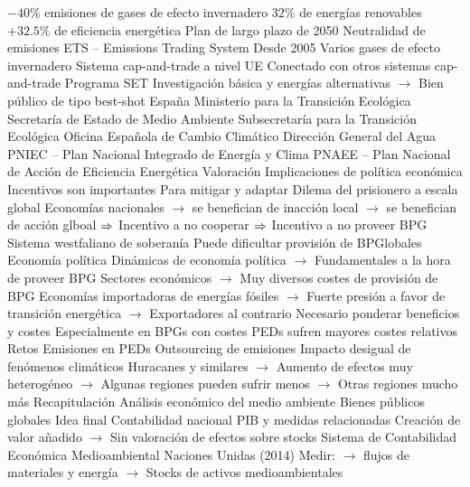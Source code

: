 \documentclass{nuevotema}
\begin{document}
\begin{esquemal}
				\4[] $-40\%$ emisiones de gases de efecto invernadero
				\4[] $32\%$ de energías renovables
				\4[] $+32.5\%$ de eficiencia energética
				\4 Plan de largo plazo de 2050
				\4[] Neutralidad de emisiones
				\4 ETS -- Emissions Trading System
				\4[] Desde 2005
				\4[] Varios gases de efecto invernadero
				\4[] Sistema cap-and-trade a nivel UE
				\4[] Conectado con otros sistemas cap-and-trade
				\4 Programa SET
				\4[] Investigación básica y energías alternativas
				\4[] $\to$ Bien público de tipo best-shot
			\3 España
				\4 Ministerio para la Transición Ecológica
				\4[$\to$] Secretaría de Estado de Medio Ambiente
				\4[] Subsecretaría para la Transición Ecológica
				\4[] Oficina Española de Cambio Climático
				\4[] Dirección General del Agua
				\4 PNIEC -- Plan Nacional Integrado de Energía y Clima
				\4 PNAEE -- Plan Nacional de Acción de Eficiencia Energética
		\2 Valoración
			\3 Implicaciones de política económica
				\4 Incentivos son importantes
				\4[] Para mitigar y adaptar
				\4 Dilema del prisionero a escala global
				\4[] Economías nacionales
				\4[] $\to$ se benefician de inacción local
				\4[] $\to$ se benefician de acción glboal
				\4[] $\Rightarrow$ Incentivo a no cooperar
				\4[] $\Rightarrow$ Incentivo a no proveer BPG
				\4 Sistema westfaliano de soberanía
				\4[] Puede dificultar provisión de BPGlobales
				\4 Economía política
				\4[] Dinámicas de economía política
				\4[] $\to$ Fundamentales a la hora de proveer BPG
				\4[] Sectores económicos
				\4[] $\to$ Muy diversos costes de provisión de BPG
				\4[] Economías importadoras de energías fósiles
				\4[] $\to$ Fuerte presión a favor de transición energética
				\4[] $\to$ Exportadores al contrario
				\4 Necesario ponderar beneficios y costes
				\4[] Especialmente en BPGs con costes
				\4 PEDs sufren mayores costes relativos
			\3 Retos
				\4 Emisiones en PEDs
				\4 Outsourcing de emisiones
				\4 Impacto desigual de fenómenos climáticos
				\4[] Huracanes y similares
				\4[] $\to$ Aumento de efectos muy heterogéneo
				\4[] $\to$ Algunas regiones pueden sufrir menos
				\4[] $\to$ Otras regiones mucho más
	\1[] 
		\2 Recapitulación
			\3 Análisis económico del medio ambiente
			\3 Bienes públicos globales
		\2 Idea final
			\3 Contabilidad nacional
				\4 PIB y medidas relacionadas
				\4[] Creación de valor añadido
				\4[] $\to$ Sin valoración de efectos sobre stocks
				\4 Sistema de Contabilidad Económica Medioambiental
				\4[] Naciones Unidas (2014)
				\4[] Medir:
				\4[] $\to$ flujos de materiales y energía
				\4[] $\to$ Stocks de activos medioambientales

\end{esquemal}
\end{document}
